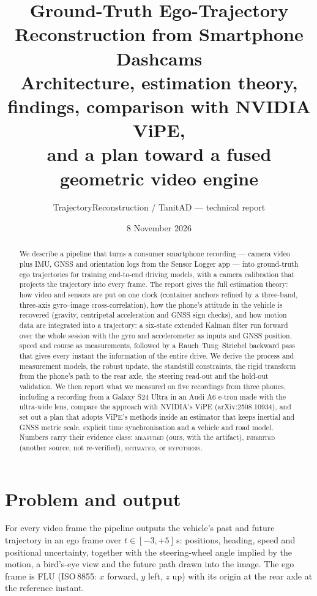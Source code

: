 \documentclass[10pt,a4paper]{article}
\title{\textbf{Ground-Truth Ego-Trajectory Reconstruction from Smartphone Dashcams}\\[4pt]
\large Architecture, estimation theory, findings, comparison with NVIDIA ViPE,\\ and a plan toward a fused geometric video engine}
\author{TrajectoryReconstruction / TanitAD --- technical report}
\date{8 November 2026}
\newcommand{\meas}{\textsc{measured}}
\newcommand{\inh}{\textsc{inherited}}
\newcommand{\est}{\textsc{estimated}}
\newcommand{\hyp}{\textsc{hypothesis}}
\begin{document}
\maketitle

\begin{abstract}
\noindent We describe a pipeline that turns a consumer smartphone recording --- camera video plus IMU,
GNSS and orientation logs from the Sensor Logger app --- into ground-truth ego trajectories for training
end-to-end driving models, with a camera calibration that projects the trajectory into every frame.
The report gives the full estimation theory: how video and sensors are put on one clock (container
anchors refined by a three-band, three-axis gyro--image cross-correlation), how the phone's attitude in
the vehicle is recovered (gravity, centripetal acceleration and GNSS sign checks), and how motion data are
integrated into a trajectory: a six-state extended Kalman filter run forward over the whole session with
the gyro and accelerometer as inputs and GNSS position, speed and course as measurements, followed by a
Rauch--Tung--Striebel backward pass that gives every instant the information of the entire drive. We
derive the process and measurement models, the robust update, the standstill constraints, the rigid
transform from the phone's path to the rear axle, the steering read-out and the hold-out validation.
We then report what we measured on five recordings from three phones, including a recording from a
Galaxy S24 Ultra in an Audi A6 e-tron made with the ultra-wide lens, compare the approach with NVIDIA's
ViPE (arXiv:2508.10934), and set out a plan that adopts ViPE's methods inside an estimator that keeps
inertial and GNSS metric scale, explicit time synchronisation and a vehicle and road model.
Numbers carry their evidence class: \meas{} (ours, with the artifact), \inh{} (another source, not
re-verified), \est{}, or \hyp.
\end{abstract}

\tableofcontents
\clearpage

\section{Problem and output}

For every video frame the pipeline outputs the vehicle's past and future trajectory in an ego frame over
$t \in [-3, +5]$\,s: positions, heading, speed and positional uncertainty, together with the steering-wheel
angle implied by the motion, a bird's-eye view and the future path drawn into the image. The ego frame is
FLU (ISO\,8855: $x$ forward, $y$ left, $z$ up) with its origin at the rear axle at the reference instant.
\end{document}
